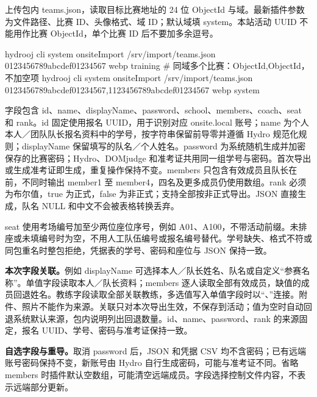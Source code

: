 \documentclass[UTF8,fontset=fandol,a4paper,11pt]{ctexart}
\begin{document}
上传包内 teams.json，读取目标比赛地址的 24 位 ObjectId 与域。最新插件参数为文件路径、比赛 ID、头像格式、域 ID；默认域填 system。本站活动 UUID 不能用作比赛 ObjectId，单个比赛 ID 后不要加多余逗号。
\begin{Code}
hydrooj cli system onsiteImport /srv/import/teams.json 0123456789abcdef01234567 webp training
# 同域多个比赛：ObjectId,ObjectId，不加空项
hydrooj cli system onsiteImport /srv/import/teams.json 0123456789abcdef01234567,1123456789abcdef01234567 webp system
\end{Code}
字段包含 id、name、displayName、password、school、members、coach、seat 和 rank。id 固定使用报名 UUID，用于识别对应 onsite.local 账号；name 为个人本人／团队队长报名资料中的学号，按字符串保留前导零并遵循 Hydro 规范化规则；displayName 保留填写的队名／个人姓名。password 为系统随机生成并加密保存的比赛密码；Hydro、DOMjudge 和准考证共用同一组学号与密码。首次导出或生成准考证即生成，重复操作保持不变。members 只包含有效成员且队长在前，不同时输出 member1 至 member4，四名及更多成员仍使用数组。rank 必须为布尔值，true 为正式，false 为非正式；支持全部按非正式导出。JSON 直接生成，队名 NULL 和中文不会被表格转换丢弃。

seat 使用考场编号加至少两位座位序号，例如 A01、A100，不带活动前缀。未排座或未填编号时为空，不用人工队伍编号或报名编号替代。学号缺失、格式不符或同包重名时整包拒绝，凭据表的学号、密码和座位与 JSON 保持一致。

\textbf{本次字段关联。}例如 displayName 可选择本人／队长姓名、队名或自定义“参赛名称”。单值字段读取本人／队长资料；members 逐人读取全部有效成员，缺值的成员回退姓名。教练字段读取全部关联教练，多选值写入单值字段时以“、”连接。附件、照片不能作为来源。关联只对本次导出生效，不保存到活动；值为空时自动回退系统默认来源，包内说明列出回退数量。id、name、password、rank 的来源固定，报名 UUID、学号、密码与准考证保持一致。

\textbf{自选字段与重导。}取消 password 后，JSON 和凭据 CSV 均不含密码；已有远端账号密码保持不变，新账号由 Hydro 自行生成密码，可能与准考证不同。省略 members 时插件默认空数组，可能清空远端成员。字段选择控制文件内容，不表示远端部分更新。
\end{document}
